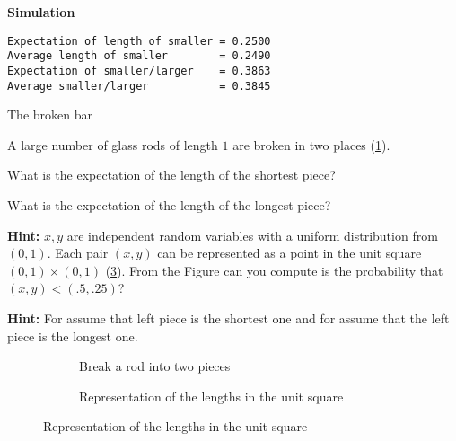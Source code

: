 \textbf{Simulation}
\begin{verbatim}
Expectation of length of smaller = 0.2500
Average length of smaller        = 0.2490
Expectation of smaller/larger    = 0.3863
Average smaller/larger           = 0.3845
\end{verbatim}



\begin{prob}{The broken bar}

A large number of glass rods of length $1$ are broken in two places (\ref{f.break1}).

 What is the expectation of the length of the shortest piece?

 What is the expectation of the length of the longest piece?

\textbf{Hint:} $x,y$ are independent random variables with a uniform distribution from $(0,1)$. Each pair $(x,y)$ can be represented as a point in the unit square $(0,1)\times (0,1)$ (\ref{f.break2}). From the Figure can you compute is the probability that $(x,y) < (.5,.25)$?

\textbf{Hint:} For  assume that left piece is the shortest one and for  assume that the left piece is the longest one.
\begin{figure}[tb]
\begin{center}
\begin{subfigure}{.4\textwidth}
\caption{Break a rod into two pieces\hspace{6em}\mbox{}}\label{f.break1}
\end{subfigure}
\hspace{3em}
\begin{subfigure}{.4\textwidth}
\caption{Representation of the lengths in the unit square}\label{f.break2}
\end{subfigure}
\end{center}
\end{figure}
\end{prob}


